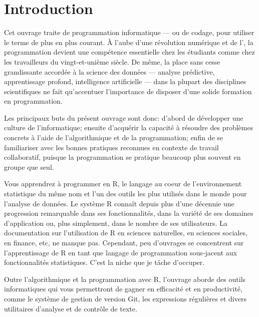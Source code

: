 
\chapter*{Introduction}

Cet ouvrage traite de programmation informatique --- ou de codage,
pour utiliser le terme de plus en plus courant. À l'aube d'une
révolution numérique et de
l', la
programmation devient une compétence essentielle chez les étudiants
comme chez les travailleurs du vingt-et-unième siècle. De même, la
place sans cesse grandissante accordée à la science des données ---
analyse prédictive, apprentissage profond, intelligence artificielle
--- dans la plupart des disciplines scientifiques ne fait qu'accentuer
l'importance de disposer d'une solide formation en programmation.

Les principaux buts du présent ouvrage sont donc: d'abord de
développer une culture de l'informatique; ensuite d'acquérir la
capacité à résoudre des problèmes concrets à l'aide de l'algorithmique
et de la programmation; enfin de se familiariser avec les bonnes
pratiques reconnues en contexte de travail collaboratif, puisque la
programmation se pratique beaucoup plus souvent en groupe que seul.

Vous apprendrez à programmer en R, le langage au coeur de
l'environnement statistique du même nom et l'un des outils les plus
utilisés dans le monde pour l'analyse de données. Le système R connaît
depuis plus d'une décennie une progression remarquable dans ses
fonctionnalités, dans la variété de ses domaines d'application ou,
plus simplement, dans le nombre de ses utilisateurs. La documentation
sur l'utilisation de R en sciences naturelles, en sciences sociales,
en finance, etc, ne manque pas. Cependant, peu d'ouvrages se
concentrent sur l'apprentissage de R en tant que langage de
programmation sous-jacent aux fonctionnalités statistiques. C'est la
niche que je tâche d'occuper.

Outre l'algorithmique et la programmation avec R, l'ouvrage aborde des
outils informatiques qui vous permettront de gagner en efficacité et
en productivité, comme le système de gestion de version Git, les
expressions régulières et divers utilitaires d'analyse et de contrôle
de texte.

